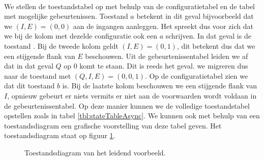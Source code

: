 \paragraph{}
We stellen de toestandstabel op met behulp van de configuratietabel en de tabel met mogelijke gebeurtenissen. Toestand $a$ betekent in dit geval bijvoorbeeld dat we $\left(I,E\right)=\left(0,0\right)$ aan de ingangen aanleggen. Het spreekt dus voor zich dat we bij de kolom met dezelde configuratie ook een $a$ schrijven. In dat geval is de toestand . Bij de tweede kolom geldt $\left(I,E\right)=\left(0,1\right)$, dit betekent dus dat we een stijgende flank van $E$ beschouwen. Uit de gebeurtenissentabel leiden we af dat in dat geval $Q$ op 0 komt te staan. Dit is reeds het geval. we migreren dus naar de toestand met $\left(Q,I,E\right)=\left(0,0,1\right)$. Op de configuratietabel zien we dat dit toestand $b$ is. Bij de laatste kolom beschouwen we een stijgende flank van $I$, opnieuw gebeurt er niets vermits er niet aan de voorwaarden wordt voldaan in de gebeurtenissentabel. Op deze manier kunnen we de volledige toestandstabel opstellen zoals in tabel \ref{tbl:stateTableAsync}. We kunnen ook met behulp van een toestandsdiagram een grafische voorstelling van deze tabel geven. Het toestandsdiagram staat op figuur \ref{fig:stateDiagramAsync}.
\begin{figure}[hbt]
\centering
{}
\caption{Toestandsdiagram van het leidend voorbeeld.}
\label{fig:stateDiagramAsync}
\end{figure}

